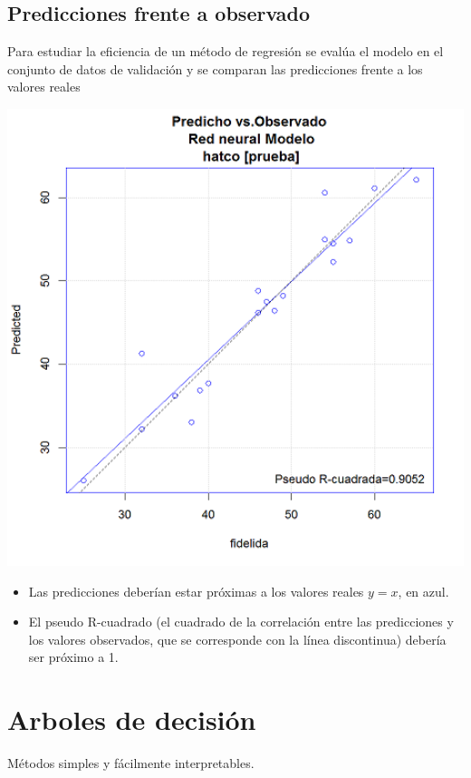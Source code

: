 \documentclass[]{book}
\begin{document}
\subsection{Predicciones frente a
observado}\label{predicciones-frente-a-observado}

Para estudiar la eficiencia de un método de regresión se evalúa el
modelo en el conjunto de datos de validación y se comparan las
predicciones frente a los valores reales

\includegraphics[width=6.38in]{images/predobs}

\begin{itemize}
\item
  Las predicciones deberían estar próximas a los valores reales \(y=x\),
  en azul.
\item
  El pseudo R-cuadrado (el cuadrado de la correlación entre las
  predicciones y los valores observados, que se corresponde con la línea
  discontinua) debería ser próximo a 1.
\end{itemize}

\section{Arboles de decisión}\label{arboles-de-decision}

Métodos simples y fácilmente interpretables.
\end{document}
